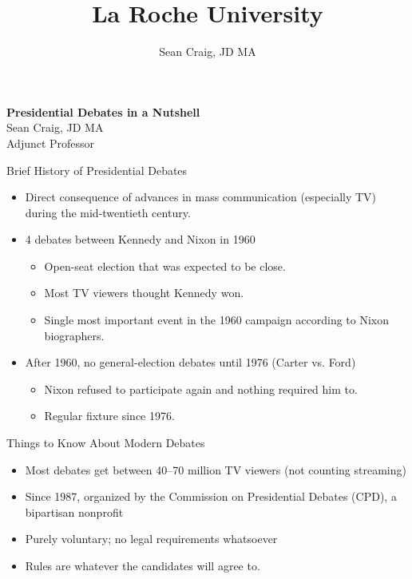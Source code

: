 \documentclass[dvipsnames,aspectratio=169]{beamer}
\title{La Roche University}
\author{Sean Craig, JD MA}
\newcommand{\pskp}{\pause\bigskip}
\begin{document}
\begin{frame}
    \begin{center}
        {\color{white} 
            {\bf\Large Presidential Debates in a Nutshell}\\[1em]
            Sean Craig, JD MA \\ 
            Adjunct Professor
        }
    \end{center}
\end{frame}

\begin{frame}{Brief History of Presidential Debates}
    \begin{itemize}
        \item Direct consequence of advances in mass communication (especially TV) during the mid-twentieth century.
        \pskp
        \item 4 debates between Kennedy and Nixon in 1960
        \pause
        \begin{itemize}
            \item Open-seat election that was expected to be close.
            \item Most TV viewers thought Kennedy won.
            \item Single most important event in the 1960 campaign according to Nixon biographers.
        \end{itemize}
        \pskp
        \item After 1960, no general-election debates until 1976 (Carter vs. Ford)
        \begin{itemize}
            \item Nixon refused to participate again and nothing required him to.
            \item Regular fixture since 1976.
        \end{itemize}
    \end{itemize}
\end{frame}

\begin{frame}{Things to Know About Modern Debates}
    \begin{itemize}
        \item Most debates get between 40--70 million TV viewers (not counting streaming)
        \pskp
        \item Since 1987, organized by the Commission on Presidential Debates (CPD), a bipartisan nonprofit
        \pskp
        \item Purely voluntary; no legal requirements whatsoever
        \pskp
        \item Rules are whatever the candidates will agree to.
    \end{itemize}
\end{frame}
\end{document}
